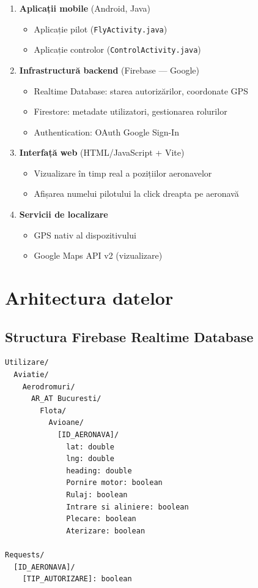 \documentclass[11pt,a4paper]{report}
\begin{document}
\begin{enumerate}
    \item \textbf{Aplicații mobile} (Android, Java)
    \begin{itemize}
        \item Aplicație pilot (\texttt{FlyActivity.java})
        \item Aplicație controlor (\texttt{ControlActivity.java})
    \end{itemize}

    \item \textbf{Infrastructură backend} (Firebase — Google)
    \begin{itemize}
        \item Realtime Database: starea autorizărilor, coordonate GPS
        \item Firestore: metadate utilizatori, gestionarea rolurilor
        \item Authentication: OAuth Google Sign-In
    \end{itemize}

    \item \textbf{Interfață web} (HTML/JavaScript + Vite)
    \begin{itemize}
        \item Vizualizare în timp real a pozițiilor aeronavelor
        \item Afișarea numelui pilotului la click dreapta pe aeronavă
    \end{itemize}

    \item \textbf{Servicii de localizare}
    \begin{itemize}
        \item GPS nativ al dispozitivului
        \item Google Maps API v2 (vizualizare)
    \end{itemize}
\end{enumerate}

\section{Arhitectura datelor}

\subsection{Structura Firebase Realtime Database}

\begin{lstlisting}
Utilizare/
  Aviatie/
    Aerodromuri/
      AR_AT Bucuresti/
        Flota/
          Avioane/
            [ID_AERONAVA]/
              lat: double
              lng: double
              heading: double
              Pornire motor: boolean
              Rulaj: boolean
              Intrare si aliniere: boolean
              Plecare: boolean
              Aterizare: boolean

Requests/
  [ID_AERONAVA]/
    [TIP_AUTORIZARE]: boolean
\end{lstlisting}
\end{document}
